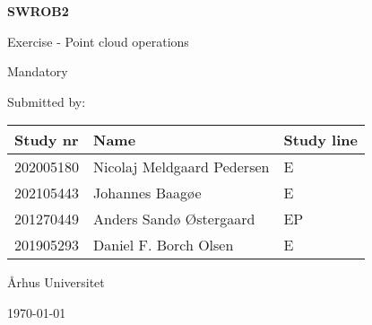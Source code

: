 \begin{titlepage}
	\centering
	\vspace*{6cm}
	{\Huge\bfseries SWROB2\par Exercise - Point cloud operations\par Mandatory\par}
	\vspace{2cm}
	Submitted by: \par 
	\begin{table}[!h]
		\centering
		\begin{tabular}{|l|l|l|}
			\hline
			Study nr  & Name 					   & Study line\\\hline
			202005180 & Nicolaj Meldgaard Pedersen & E\\\hline
			202105443 & Johannes Baagøe 		   & E\\\hline
			201270449 & Anders Sandø Østergaard    & EP\\\hline
			201905293 & Daniel F. Borch Olsen	   & E\\\hline
		\end{tabular}
	\end{table}
	\vspace{4cm}
	Århus Universitet \par
	\vfill
	\today
\end{titlepage}
\thispagestyle{empty}
\tableofcontents
\clearpage